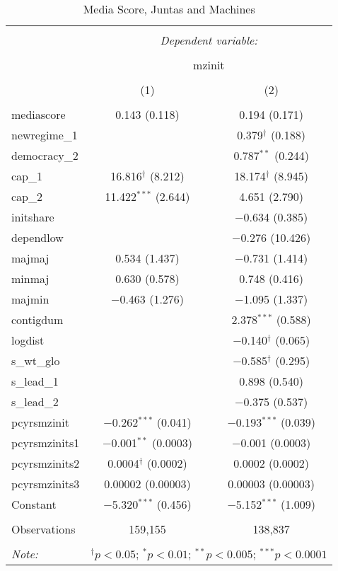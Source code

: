 
\begin{table}[!htbp] \centering 
  \caption{Media Score, Juntas and Machines} 
  \label{} 
\begin{tabular}{@{\extracolsep{5pt}}lcc} 
\\[-1.8ex]\hline 
\hline \\[-1.8ex] 
 & \multicolumn{2}{c}{\textit{Dependent variable:}} \\ 
\cline{2-3} 
\\[-1.8ex] & \multicolumn{2}{c}{mzinit} \\ 
\\[-1.8ex] & (1) & (2)\\ 
\hline \\[-1.8ex] 
 mediascore & 0.143 (0.118) & 0.194 (0.171) \\ 
  newregime\_1 &  & 0.379$^{\dagger}$ (0.188) \\ 
  democracy\_2 &  & 0.787$^{**}$ (0.244) \\ 
  cap\_1 & 16.816$^{\dagger}$ (8.212) & 18.174$^{\dagger}$ (8.945) \\ 
  cap\_2 & 11.422$^{***}$ (2.644) & 4.651 (2.790) \\ 
  initshare &  & $-$0.634 (0.385) \\ 
  dependlow &  & $-$0.276 (10.426) \\ 
  majmaj & 0.534 (1.437) & $-$0.731 (1.414) \\ 
  minmaj & 0.630 (0.578) & 0.748 (0.416) \\ 
  majmin & $-$0.463 (1.276) & $-$1.095 (1.337) \\ 
  contigdum &  & 2.378$^{***}$ (0.588) \\ 
  logdist &  & $-$0.140$^{\dagger}$ (0.065) \\ 
  s\_wt\_glo &  & $-$0.585$^{\dagger}$ (0.295) \\ 
  s\_lead\_1 &  & 0.898 (0.540) \\ 
  s\_lead\_2 &  & $-$0.375 (0.537) \\ 
  pcyrsmzinit & $-$0.262$^{***}$ (0.041) & $-$0.193$^{***}$ (0.039) \\ 
  pcyrsmzinits1 & $-$0.001$^{**}$ (0.0003) & $-$0.001 (0.0003) \\ 
  pcyrsmzinits2 & 0.0004$^{\dagger}$ (0.0002) & 0.0002 (0.0002) \\ 
  pcyrsmzinits3 & 0.00002 (0.00003) & 0.00003 (0.00003) \\ 
  Constant & $-$5.320$^{***}$ (0.456) & $-$5.152$^{***}$ (1.009) \\ 
 \hline \\[-1.8ex] 
Observations & 159,155 & 138,837 \\ 
\hline 
\hline \\[-1.8ex] 
\textit{Note:}  & \multicolumn{2}{r}{$^{\dagger} p<0.05$; $^{*} p<0.01$; $^{**} p<0.005$; $^{***} p<0.0001$} \\ 
\end{tabular} 
\end{table} 
